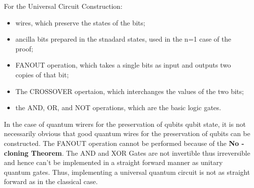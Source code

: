 \documentclass[12pt, oneside]{book}
\theoremstyle{definition}
\theoremstyle{definition}
\theoremstyle{remark}
\begin{document}
For the Universal Circuit Construction:
\begin{itemize}
    \item wires, which preserve the states of the bits;
    \item ancilla bits prepared in the stnadard states, used in the n=1 case of the proof;
    \item FANOUT operation, which takes a single bits as input and outputs two copies of that bit;
    \item The CROSSOVER opertaion, which interchanges the values of the two bits;
    \item the AND, OR, and NOT operations, which are the basic logic gates.
\end{itemize}

In the case of quantum wirers for the preservation of qubits qubit state, it is not necessarily obvious that good quantum wires for
the preservation of qubits can be constructed. The FANOUT operation cannot be performed because of the \textbf{No - cloning Theorem}.
The AND and XOR Gates are not invertible thus irreversible and hence can't be implemented in a straight forward manner as unitary quantum gates.
Thus, implementing a universal quantum circuit is not as straight forward as in the classical case.
\end{document}
